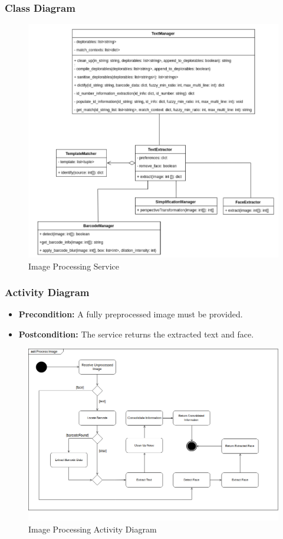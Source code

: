 \documentclass{article}
\begin{document}
\subsubsection{Class Diagram}
	\begin{figure}[H]
	    \centering
	    \includegraphics[scale=0.5]{img/extractClassDiagram.png}
	    \caption{Image Processing Service}
	 \end{figure}
	 \pagebreak
\subsubsection{Activity Diagram}
\begin{itemize}
        \item \textbf{Precondition:} A fully preprocessed image must be provided.
        \item \textbf{Postcondition:} The service returns the extracted text and face.
    \end{itemize}
	\begin{figure}[H]
	    \centering
	    \includegraphics[scale=0.5]{img/process_activity.png}
	    \caption{Image Processing Activity Diagram}
	 \end{figure}
	 \pagebreak
\end{document}
